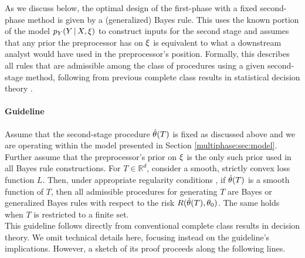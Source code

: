 As we discuss below, the optimal design of the first-phase with a fixed second-phase method is given by a  (generalized) Bayes rule.
This uses the known portion of the model $p_Y(Y \, | \, X, \xi)$ to construct inputs for the second stage and assumes that any prior the preprocessor has on $\xi$  is equivalent to what a downstream analyst  would have used in the preprocessor's position.
Formally, this describes all rules that are admissible among the class of procedures using a given second-stage method, following from previous complete class results in statistical decision theory \citep[e.g.][]{Berger1985,Farrell1968}.

\paragraph{Guideline}
Assume that the second-stage procedure $\hat{\theta}(T)$ is fixed as discussed above and we are operating within the model presented in Section \ref{multiphase:sec:model}.
Further assume that the preprocessor's prior on $\xi$ is the only such prior used in all Bayes rule constructions.
For $T \in \mathbb{R}^d$, consider a smooth, strictly convex loss function $L$.
Then, under appropriate regularity conditions \citep[e.g.][]{Berger1985,Farrell1968}, if $\hat{\theta}(T)$ is a smooth function of $T$, then all admissible procedures for generating $T$ are Bayes or generalized Bayes rules with respect to the risk $R(\hat{\theta}(T), \theta_0)$.
The same holds when $T$ is restricted to a finite set.\\

This guideline follows directly from conventional complete class results in decision theory.
We omit technical details here, focusing instead on the guideline's implications.
However, a sketch of its proof proceeds along the following lines.

